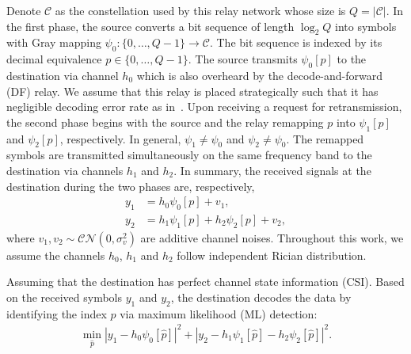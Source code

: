 \documentclass[journal,draftcls,onecolumn,12pt,twoside]{IEEEtran}
\begin{document}
Denote $\mathcal{C}$ as the constellation used by this relay network whose size
is $Q = |\mathcal{C}|$. In the first phase, the source converts a bit sequence
of length $\log_2Q$ into symbols with Gray mapping $\psi_0: \{0,\ldots,Q -
1\}\rightarrow \mathcal{C}$. The bit sequence is indexed by its decimal
equivalence $p\in \{0,\ldots,Q - 1\}$. The source transmits $\psi_0[p]$ to the
destination via channel $h_0$ which is also overheard by the decode-and-forward
(DF) relay. We assume that this relay is placed strategically such that it has
negligible decoding error rate as in~\cite{ryu2011ber, kim2009design}. Upon
receiving a request for retransmission, the second phase begins with
the source and the relay remapping $p$ into $\psi_1[p]$ and $\psi_2[p]$,
respectively.  In general,  $\psi_1\not=\psi_0$ and $\psi_2\not=\psi_0$. The
remapped symbols are transmitted simultaneously on the same frequency band to the
destination via channels $h_1$ and $h_2$. In summary, the received signals at the
destination during the two phases are, respectively, 
\begin{subequations}
    \begin{align}
       y_1 & = h_0\psi_0[p] + v_1, \\
       y_2 & = h_1\psi_1[p] + h_2\psi_2[p] + v_2,
    \end{align}
\end{subequations}
where $v_1, v_2\sim\mathcal{CN}(0,\sigma_v^2)$ are additive channel noises.
Throughout this work, we assume the channels $h_0$, $h_1$ and $h_2$ follow
independent Rician distribution.

Assuming that the destination has perfect channel state information (CSI). Based
on the received symbols $y_1$ and $y_2$,  the destination decodes the data by
identifying the index $p$ via maximum likelihood (ML) detection:
\begin{align}
    \min_{\hat{p}} |y_1 - h_0\psi_0[\hat{p}]|^2 + |y_2-
    h_1\psi_1[\hat{p}] - h_2\psi_2[\hat{p}]|^2.
    \label{eq:ML}
\end{align}

%
%
\end{document}
